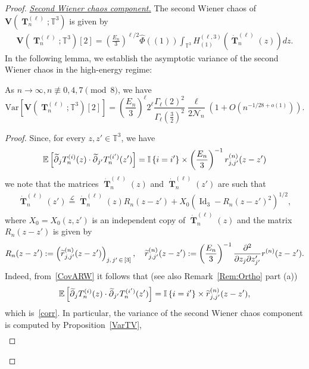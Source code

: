 \documentclass[AHL,Unicode,longabstracts,published]{cedram}
\DeclareMathOperator{\Id}{Id}
\DeclareMathOperator{\bT}{\mathbf{T}}
\newcommand{\bfv}{\mathbf{V}}
\newcommand{\T}{\mathbb{T}^3}
\newcommand{\E}[1]{\mathbb{E}\left[#1\right]}
\newcommand{\V}[1]{\mathrm{Var}{\left[#1\right]}}
\newcommand{\eqLaw}{ \overset{\mathcal{L}}{=} }
\newcommand{\ind}[1]{\mathbb{I}
\left\{#1\right\}}
\newcommand{\notcon}[3]{ {#1} \not\equiv {#2} \pmod {#3} }
\newcommand{\Nn}{\mathcal{N}_n}
\let\oldtilde\tilde
\renewcommand*{\tilde}[1]{\mathchoice{\widetilde{#1}}{\widetilde{#1}}{\oldtilde{#1}}{\oldtilde{#1}}}
\begin{document}
\begin{proof}
\noindent\underline{\emph{Second Wiener chaos component.}} The second Wiener chaos of $\bfv(\bT_n^{(\ell)};\T)$ is given by
\begin{gather}\label{WC2}
\bfv\left(\bT_n^{(\ell)};\T\right)[2] =
\left(\frac{E_n}{3}\right)^{\ell/2} \widehat{\Phi}((1)) \int_{\T} H_{(1)}^{(\ell,3)}\left(\dot{\bT}_n^{(\ell)}(z)\right) dz.
\end{gather}
In the following lemma, we establish the asymptotic variance of the second Wiener chaos in the high-energy regime:
\begin{lemm}\label{Var2}
As $n\to \infty, \notcon{n}{0,4,7}{8}$, we have
\begin{equation*}
\V{\bfv\left(\bT_n^{(\ell)};\T\right)[2]}=
\left(\frac{E_n}{3}\right)^{\ell} 2^{\ell} \frac{\Gamma_{\ell}(2)^2}{\Gamma_{\ell}(\frac{3}{2})^2}
\frac{\ell}{2\Nn}\left(1 + O\left(n^{-1/28+o(1)}\right)\right).
\end{equation*}
\end{lemm}
\begin{proof}
Since, for every $z,z' \in \T$, we have
\begin{gather}\label{corr}
\E{ \tilde{\partial}_jT_n^{(i)}(z) \cdot \tilde{\partial}_{j'} T_n^{(i')}(z')} = \ind{i=i'} \times \left(\frac{E_n}{3}\right)^{-1} r^{(n)}_{j,j'}(z-z')
\end{gather}
we note that the matrices $\dot{\bT}_n^{(\ell)}(z)$ and $\dot{\bT}_n^{(\ell)}(z')$ are such that
\begin{gather}\label{CovARW}
\dot{\bT}_n^{(\ell)}(z')\eqLaw\dot{\bT}_n^{(\ell)}(z)R_n(z-z') +X_0\left(\Id_3-R_n(z-z')^2\right)^{1/2},
\end{gather}
where $X_0=X_0(z,z')$ is an independent copy of $\dot{\bT}_n^{(\ell)}(z)$ and the matrix $R_n(z-z')$ is given by
\begin{gather*}
R_n(z-z'):= \left(\tilde{r}^{(n)}_{j,j'}(z-z')\right)_{j,\,j'\,\in\,[3]}, \quad
\tilde{r}^{(n)}_{j,j'}(z-z'):=\left(\frac{E_n}{3}\right)^{-1} \frac{\partial^2}{\partial z_j \partial z'_{j'}} r^{(n)}(z-z').
\end{gather*}
Indeed, from~\eqref{CovARW} it follows that (see also Remark~\ref{Rem:Ortho} part (a))
\begin{gather*}
\E{ \tilde{\partial}_jT_n^{(i)}(z) \cdot \tilde{\partial}_{j'} T_n^{(i')}(z') } = \ind{i=i'} \times \tilde{r}^{(n)}_{j,j'}(z-z'),
\end{gather*}
which is~\eqref{corr}. In particular, the variance of the second Wiener chaos component is computed by Proposition~\ref{VarTV},
\begin{multline}\label{Var2TOT}

\end{multline}
\end{proof}
\end{proof}
\end{document}
